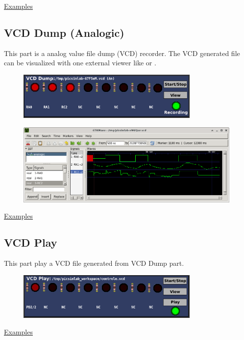 \href{https://lcgamboa.github.io/picsimlab_examples/parts_VCD_Dump.html}{Examples}


\subsection{VCD Dump (Analogic)}


This part is a analog value file dump (VCD) recorder. The VCD generated file can be visualized with one external viewer like 
 or .  

\begin{figure}[H]
\center
\includegraphics[width=0.8\textwidth]{img/part_vcd_dump_an.png} 
\end{figure}



\begin{figure}[H]
\center
\includegraphics[width=0.99\textwidth]{img/part_vcd_dump_gtkwave_an.png} 
\end{figure}

\href{https://lcgamboa.github.io/picsimlab_examples/parts_VCD_Dump_(Analogic).html}{Examples}

 
\subsection{VCD Play}


This part play a VCD file generated from VCD Dump part.  

\begin{figure}[H]
\center
\includegraphics[width=0.8\textwidth]{img/part_vcd_play.png} 
\end{figure}


\href{https://lcgamboa.github.io/picsimlab_examples/parts_VCD_Play.html}{Examples}


